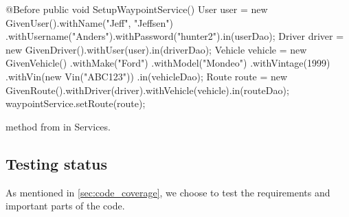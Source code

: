\begin{listing}
    \begin{java2}
        @Before
        public void SetupWaypointService() {
            User user = new GivenUser().withName("Jeff", "Jeffsen")
                .withUsername("Anders").withPassword("hunter2").in(userDao);
            Driver driver = new GivenDriver().withUser(user).in(driverDao);
            Vehicle vehicle = new GivenVehicle()
                .withMake("Ford")
                .withModel("Mondeo")
                .withVintage(1999)
                .withVin(new Vin("ABC123"))
                .in(vehicleDao);
            Route route = new GivenRoute().withDriver(driver).withVehicle(vehicle).in(routeDao);
            waypointService.setRoute(route);
        }
    \end{java2}
    \caption{ method from  in Services.}
    \label{lst:setupwaypointservice}
\end{listing}

\subsection{Testing status}
As mentioned in \cref{sec:code_coverage}, we choose to test the requirements and important parts of the code.
